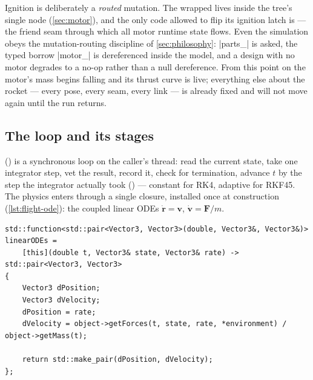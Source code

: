 Ignition is deliberately a \emph{routed} mutation. The wrapped  lives inside the
tree's single  node (\cref{sec:motor}), and the only code allowed to flip its
ignition latch is  --- the friend seam through which all motor
runtime state flows. Even the simulation obeys the mutation-routing discipline of
\cref{sec:philosophy}: \cppinline|parts_| is asked, the typed borrow \cppinline|motor_| is
dereferenced inside the model, and a design with no motor degrades to a no-op rather than a null
dereference. From this point on the motor's mass begins falling and its thrust curve is live;
everything else about the rocket --- every pose, every seam, every link --- is already fixed and
will not move again until the run returns.

\subsection{The loop and its stages}\label{sec:flight-loop}

 () is a synchronous loop on the
caller's thread: read the current state, take one integrator step, vet the result, record it,
check for termination, advance $t$ by the step the integrator actually took
() --- constant for RK4, adaptive for RKF45. The physics enters
through a single closure, installed once at construction (\cref{lst:flight-ode}): the coupled
linear ODEs $\dot{\mathbf r} = \mathbf v$, $\dot{\mathbf v} = \mathbf F/m$.

\begin{listing}[htbp]
\begin{verbatim}
std::function<std::pair<Vector3, Vector3>(double, Vector3&, Vector3&)> linearODEs =
    [this](double t, Vector3& state, Vector3& rate) -> std::pair<Vector3, Vector3>
{
    Vector3 dPosition;
    Vector3 dVelocity;
    dPosition = rate;
    dVelocity = object->getForces(t, state, rate, *environment) / object->getMass(t);

    return std::make_pair(dPosition, dVelocity);
};
\end{verbatim}
\caption{The ODE right-hand side ().  is the
rocket behind the  interface --- the sim never sees a part, a node, or a
motor.}\label{lst:flight-ode}
\end{listing}

